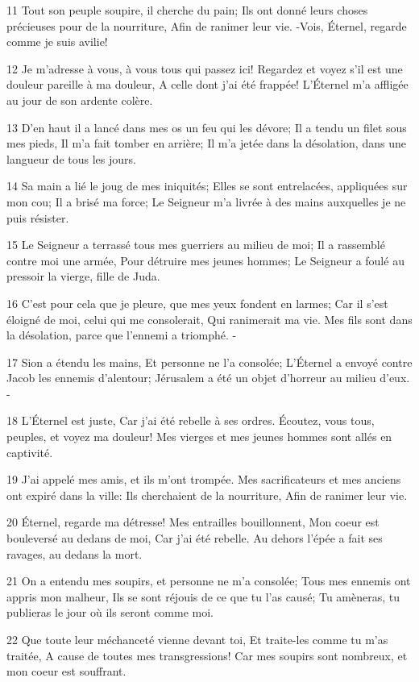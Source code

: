 \par 11 Tout son peuple soupire, il cherche du pain; Ils ont donné leurs choses précieuses pour de la nourriture, Afin de ranimer leur vie. -Vois, Éternel, regarde comme je suis avilie!
\par 12 Je m'adresse à vous, à vous tous qui passez ici! Regardez et voyez s'il est une douleur pareille à ma douleur, A celle dont j'ai été frappée! L'Éternel m'a affligée au jour de son ardente colère.
\par 13 D'en haut il a lancé dans mes os un feu qui les dévore; Il a tendu un filet sous mes pieds, Il m'a fait tomber en arrière; Il m'a jetée dans la désolation, dans une langueur de tous les jours.
\par 14 Sa main a lié le joug de mes iniquités; Elles se sont entrelacées, appliquées sur mon cou; Il a brisé ma force; Le Seigneur m'a livrée à des mains auxquelles je ne puis résister.
\par 15 Le Seigneur a terrassé tous mes guerriers au milieu de moi; Il a rassemblé contre moi une armée, Pour détruire mes jeunes hommes; Le Seigneur a foulé au pressoir la vierge, fille de Juda.
\par 16 C'est pour cela que je pleure, que mes yeux fondent en larmes; Car il s'est éloigné de moi, celui qui me consolerait, Qui ranimerait ma vie. Mes fils sont dans la désolation, parce que l'ennemi a triomphé. -
\par 17 Sion a étendu les mains, Et personne ne l'a consolée; L'Éternel a envoyé contre Jacob les ennemis d'alentour; Jérusalem a été un objet d'horreur au milieu d'eux. -
\par 18 L'Éternel est juste, Car j'ai été rebelle à ses ordres. Écoutez, vous tous, peuples, et voyez ma douleur! Mes vierges et mes jeunes hommes sont allés en captivité.
\par 19 J'ai appelé mes amis, et ils m'ont trompée. Mes sacrificateurs et mes anciens ont expiré dans la ville: Ils cherchaient de la nourriture, Afin de ranimer leur vie.
\par 20 Éternel, regarde ma détresse! Mes entrailles bouillonnent, Mon coeur est bouleversé au dedans de moi, Car j'ai été rebelle. Au dehors l'épée a fait ses ravages, au dedans la mort.
\par 21 On a entendu mes soupirs, et personne ne m'a consolée; Tous mes ennemis ont appris mon malheur, Ils se sont réjouis de ce que tu l'as causé; Tu amèneras, tu publieras le jour où ils seront comme moi.
\par 22 Que toute leur méchanceté vienne devant toi, Et traite-les comme tu m'as traitée, A cause de toutes mes transgressions! Car mes soupirs sont nombreux, et mon coeur est souffrant.

